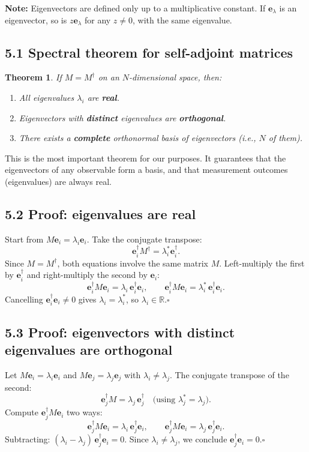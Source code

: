 \documentclass[12pt,a4paper]{article}
\newtheorem{theorem}{Theorem}
\begin{document}
\noindent\textbf{Note:} Eigenvectors are defined only up to a multiplicative constant.  If $\mathbf{e}_\lambda$ is an eigenvector, so is $z\mathbf{e}_\lambda$ for any $z\neq 0$, with the same eigenvalue.

\subsection{5.1 Spectral theorem for self-adjoint matrices}

\begin{theorem}
If $M = M^\dagger$ on an $N$-dimensional space, then:
\begin{enumerate}[nosep]
    \item All eigenvalues $\lambda_i$ are \textbf{real}.
    \item Eigenvectors with \textbf{distinct} eigenvalues are \textbf{orthogonal}.
    \item There exists a \textbf{complete} orthonormal basis of eigenvectors (i.e., $N$ of them).
\end{enumerate}
\end{theorem}

\noindent This is the most important theorem for our purposes.  It guarantees that the eigenvectors of any observable form a basis, and that measurement outcomes (eigenvalues) are always real.

\subsection{5.2 Proof: eigenvalues are real}
Start from $M\mathbf{e}_i=\lambda_i\mathbf{e}_i$.  Take the conjugate transpose:
\[
    \mathbf{e}_i^\dagger M^\dagger = \lambda_i^*\mathbf{e}_i^\dagger.
\]
Since $M=M^\dagger$, both equations involve the same matrix $M$.  Left-multiply the first by $\mathbf{e}_i^\dagger$ and right-multiply the second by $\mathbf{e}_i$:
\[
    \mathbf{e}_i^\dagger M\mathbf{e}_i = \lambda_i\,\mathbf{e}_i^\dagger\mathbf{e}_i, \qquad
    \mathbf{e}_i^\dagger M\mathbf{e}_i = \lambda_i^*\,\mathbf{e}_i^\dagger\mathbf{e}_i.
\]
Cancelling $\mathbf{e}_i^\dagger\mathbf{e}_i\neq 0$ gives $\lambda_i = \lambda_i^*$, so $\lambda_i\in\mathbb{R}$.\;$\square$

\subsection{5.3 Proof: eigenvectors with distinct eigenvalues are orthogonal}
Let $M\mathbf{e}_i=\lambda_i\mathbf{e}_i$ and $M\mathbf{e}_j=\lambda_j\mathbf{e}_j$ with $\lambda_i\neq\lambda_j$.  The conjugate transpose of the second:
\[
    \mathbf{e}_j^\dagger M = \lambda_j\,\mathbf{e}_j^\dagger \quad\text{(using $\lambda_j^*=\lambda_j$)}.
\]
Compute $\mathbf{e}_j^\dagger M\mathbf{e}_i$ two ways:
\[
    \mathbf{e}_j^\dagger M\mathbf{e}_i = \lambda_i\,\mathbf{e}_j^\dagger\mathbf{e}_i, \qquad
    \mathbf{e}_j^\dagger M\mathbf{e}_i = \lambda_j\,\mathbf{e}_j^\dagger\mathbf{e}_i.
\]
Subtracting: $(\lambda_i - \lambda_j)\,\mathbf{e}_j^\dagger\mathbf{e}_i=0$.  Since $\lambda_i\neq\lambda_j$, we conclude $\mathbf{e}_j^\dagger\mathbf{e}_i=0$.\;$\square$
\end{document}
